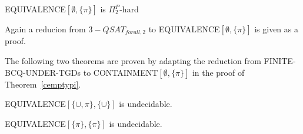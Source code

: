 \begin{theorem}
EQUIVALENCE$[\emptyset,\{\pi\}]$ is $\Pi_2^P$-hard
\end{theorem}
\begin{proofidea}
Again a reducion from $3-QSAT_{forall,2}$ to  EQUIVALENCE$[\emptyset,\{\pi\}]$
is given as a proof.
\end{proofidea}

The following two theorems are proven by adapting the reduction from
FINITE-BCQ-UNDER-TGDs to CONTAINMENT$[\emptyset,\{\pi\}]$ in the proof of 
Theorem~\ref{cemptypi}.
\begin{theorem}
EQUIVALENCE$[\{\cup,\pi\},\{\cup\}]$ is undecidable.
\end{theorem}
\begin{theorem}
EQUIVALENCE$[\{\pi\},\{\pi\}]$ is undecidable.
\end{theorem}
